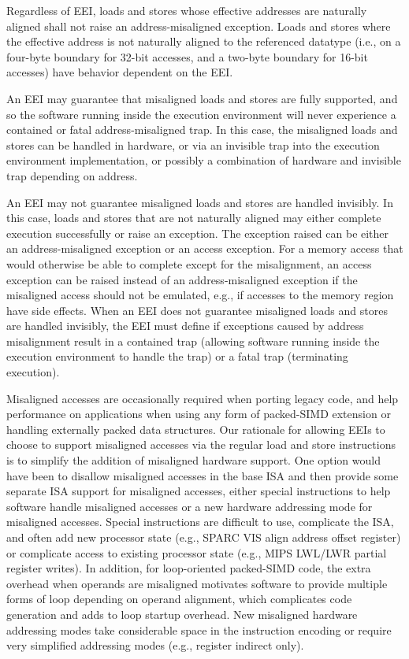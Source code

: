 Regardless of EEI, loads and stores whose effective addresses are
naturally aligned shall not raise an address-misaligned exception.
Loads and stores where the effective address is not naturally aligned
to the referenced datatype (i.e., on a four-byte boundary for 32-bit
accesses, and a two-byte boundary for 16-bit accesses) have behavior
dependent on the EEI.

An EEI may guarantee that misaligned loads and stores are fully
supported, and so the software running inside the execution
environment will never experience a contained or fatal
address-misaligned trap.  In this case, the misaligned loads and
stores can be handled in hardware, or via an invisible trap into the
execution environment implementation, or possibly a combination of
hardware and invisible trap depending on address.

An EEI may not guarantee misaligned loads and stores are handled
invisibly.  In this case, loads and stores that are not naturally
aligned may either complete execution successfully or raise an
exception.  The exception raised can be either an address-misaligned
exception or an access exception.  For a memory access that would
otherwise be able to complete except for the misalignment, an access
exception can be raised instead of an address-misaligned exception if
the misaligned access should not be emulated, e.g., if accesses to the
memory region have side effects.  When an EEI does not guarantee
misaligned loads and stores are handled invisibly, the EEI must define
if exceptions caused by address misalignment result in a contained
trap (allowing software running inside the execution environment to
handle the trap) or a fatal trap (terminating execution).

\begin{commentary}
Misaligned accesses are occasionally required when porting legacy
code, and help performance on applications when using any form of
packed-SIMD extension or handling externally packed data structures.
Our rationale for allowing EEIs to choose to support misaligned
accesses via the regular load and store instructions is to simplify
the addition of misaligned hardware support.  One option would have
been to disallow misaligned accesses in the base ISA and then provide
some separate ISA support for misaligned accesses, either special
instructions to help software handle misaligned accesses or a new
hardware addressing mode for misaligned accesses.  Special
instructions are difficult to use, complicate the ISA, and often add
new processor state (e.g., SPARC VIS align address offset register) or
complicate access to existing processor state (e.g., MIPS LWL/LWR
partial register writes).  In addition, for loop-oriented packed-SIMD
code, the extra overhead when operands are misaligned motivates
software to provide multiple forms of loop depending on operand
alignment, which complicates code generation and adds to loop startup
overhead.  New misaligned hardware addressing modes take considerable
space in the instruction encoding or require very simplified
addressing modes (e.g., register indirect only).
\end{commentary}

